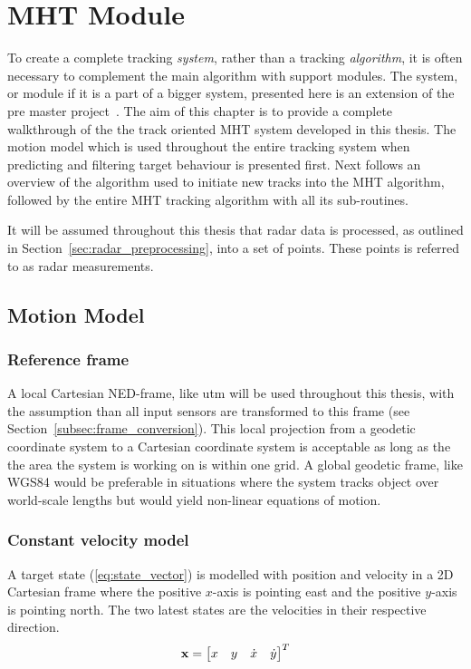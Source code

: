 
\chapter{MHT Module}\label{chapter:mht-module}
To create a complete tracking \emph{system}, rather than a tracking \emph{\gls{algorithm}}, it is often necessary to complement the main algorithm with support modules. The system, or module if it is a part of a bigger system, presented here is an extension of the pre master project~\cite{Liland_2017}. The aim of this chapter is to provide a complete walkthrough of the the track oriented MHT system developed in this thesis. The motion model which is used throughout the entire tracking system when predicting and filtering target behaviour is presented first. Next follows an overview of the algorithm used to initiate new tracks into the MHT algorithm, followed by the entire MHT tracking algorithm with all its sub-routines.

It will be assumed throughout this thesis that radar data is processed, as outlined in Section~\ref{sec:radar_preprocessing}, into a set of points. These points is referred to as radar measurements.

\section{Motion Model}\label{sec:motion-model}
\subsection{Reference frame}
A local Cartesian NED-frame, like \gls{utm} will be used throughout this thesis, with the assumption than all input sensors are transformed to this frame (see Section~\ref{subsec:frame_conversion}). This local projection from a geodetic coordinate system to a Cartesian coordinate system is acceptable as long as the the area the system is working on is within one grid. A global geodetic frame, like WGS84 would be preferable in situations where the system tracks object over world-scale lengths but would yield non-linear equations of motion.

\subsection{Constant velocity model}
A target state (\ref{eq:state_vector}) is modelled with position and velocity in a 2D Cartesian frame where the positive \(x\)-axis is pointing east and the positive \(y\)-axis is pointing north. The two latest states are the velocities in their respective direction.
\begin{equation}
\boldsymbol{\mathbf{x}} = \begin{bmatrix}
x & y & \dot{x} & \dot{y}
\end{bmatrix}^T
\label{eq:state_vector}
\end{equation}

